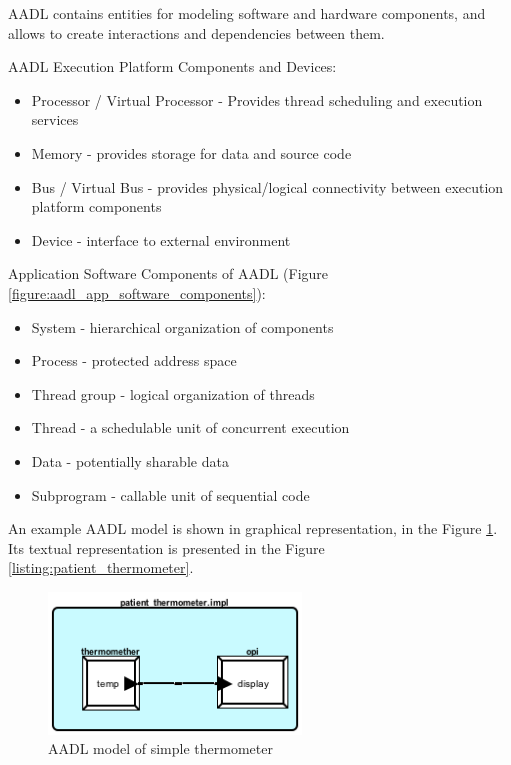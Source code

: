 AADL contains entities for modeling software and hardware components, and allows to create interactions and dependencies between them.

AADL Execution Platform Components and Devices:
\begin{itemize}
	\item Processor / Virtual Processor - Provides thread scheduling and execution services
	\item Memory - provides storage for data and source code
	\item Bus / Virtual Bus - provides physical/logical connectivity between execution platform components
	\item Device - interface to external environment
\end{itemize}

Application Software Components of AADL (Figure \ref{figure:aadl_app_software_components}):
\begin{itemize}
	\item System - hierarchical organization of components
	\item Process - protected address space
	\item Thread group - logical organization of threads
	\item Thread - a schedulable unit of concurrent execution
	\item Data - potentially sharable data
	\item Subprogram - callable unit of sequential code
\end{itemize}

An example AADL model is shown in graphical representation, in the Figure \ref{figure:patient_thermometer}. Its textual representation is presented in the Figure \ref{listing:patient_thermometer}.

\begin{figure}[ht]%
    \begin{center}
    	\includegraphics[width=0.6\textwidth]{figures/patient_thermometer.png}    	
    \end{center}
    \caption{AADL model of simple thermometer}
    \label{figure:patient_thermometer}
\end{figure}

